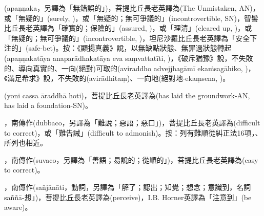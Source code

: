 \startitemgroup[noteitems]
\item{}(apaṇṇaka，另譯為「無錯誤的」)，菩提比丘長老英譯為(The Unmistaken, AN)，或「無疑的」(surely, )，或「無疑的；無可爭議的」(incontrovertible, SN)，智髻比丘長老英譯為「確實的；保險的」(assured, )，或「理清」(cleared up, )，或「無疑的；無可爭議的」(incontrovertible, )，坦尼沙羅比丘長老英譯為「安全下注的」(safe-bet)。按：《顯揚真義》說，以無缺點狀態、無罪過狀態轉起(apaṇṇakatāya anaparādhakatāya eva saṃvattatīti, )，《破斥猶豫》說，不失敗的、導向真實的、一向(絕對)可取的(aviraddho advejjhagāmī ekaṁsagāhiko, )，《滿足希求》說，不失敗的(avirādhitaṃ)、一向地(絕對地-ekaṃsena, )。
\stopitemgroup

\startitemgroup[noteitems]
\item{}(yoni cassa āraddhā hoti)，菩提比丘長老英譯為(has laid the groundwork-AN, has laid a foundation-SN)。
\stopitemgroup

\startitemgroup[noteitems]
\item{}，南傳作(dubbaco，另譯為「難說；惡語；惡口」)，菩提比丘長老英譯為(difficult to correct)，或「難告誡」(difficult to admonish)。按：列有難順從糾正法16項，、所列也相近。
\item{}，南傳作(suvaco，另譯為「善語；易說的；從順的」)，菩提比丘長老英譯為(easy to correct)。
\stopitemgroup

\startitemgroup[noteitems]
\item{}，南傳作(sañjānāti，動詞，另譯為「解了；認出；知覺；想念；意識到，名詞saññā-想」)，菩提比丘長老英譯為(perceive)，I.B. Horner英譯為「注意到」(be aware)。
\stopitemgroup

